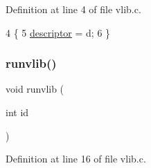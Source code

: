 Definition at line 4 of file vlib.\+c.


\begin{DoxyCode}
4                                   \{
5     \hyperlink{a00158_abe9fbaaf473cf2fa8d2a0ef1786fabd2_abe9fbaaf473cf2fa8d2a0ef1786fabd2}{descriptor} = d;
6 \}
\end{DoxyCode}
\mbox{\label{a00158_a6889af26c1cca94090023d5975955cbf_a6889af26c1cca94090023d5975955cbf}} 
\subsubsection{\texorpdfstring{runvlib()}{runvlib()}}
{\footnotesize\ttfamily void runvlib (\begin{DoxyParamCaption}\item[{int}]{id }\end{DoxyParamCaption})}



Definition at line 16 of file vlib.\+c.


